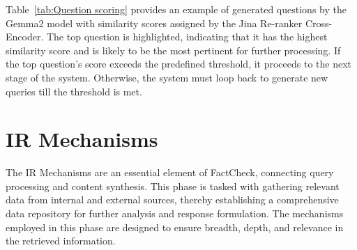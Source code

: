 \begin{table}[h!]
    \noindent
    \caption{Example of generated questions by the Gemma2 model with relevance scores assigned by the Jina Re-ranker Cross-Encoder.}
    \label{tab:Question scoring}
\end{table}

Table~\ref{tab:Question scoring} provides an example of generated questions by the Gemma2 model with similarity scores assigned by the Jina Re-ranker Cross-Encoder.
The top question is highlighted, indicating that it has the highest similarity score and is likely to be the most pertinent for further processing.
If the top question's score exceeds the predefined threshold, it proceeds to the next stage of the system.
Otherwise, the system must loop back to generate new queries till the threshold is met.

\section{\ac{IR} Mechanisms}\label{sec:information-retrieval-mechanisms}
The \ac{IR} Mechanisms are an essential element of FactCheck, connecting query processing and content synthesis.
This phase is tasked with gathering relevant data from internal and external sources, thereby establishing a comprehensive data repository for further analysis and response formulation.
The mechanisms employed in this phase are designed to ensure breadth, depth, and relevance in the retrieved information.

